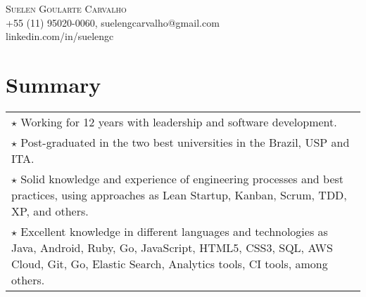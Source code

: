 \documentclass[a4paper, oneside, final]{scrartcl}
\newcommand{\vspc}{\vspace{0.15cm}} %
\begin{document}
\begin{center}

\textsc{\Huge{Suelen Goularte Carvalho}} \vspc\\
{\small +55 (11) 95020-0060, suelengcarvalho@gmail.com} \vspc\\
{\small linkedin.com/in/suelengc}






\section{Summary}
\begin{tabularx}{1\linewidth}{X}

$\star$ Working for 12 years with leadership and software development. \vspc \\

$\star$ Post-graduated in the two best universities in the Brazil, USP and ITA. \vspc \\

$\star$ Solid knowledge and experience of engineering processes and best practices, using approaches as Lean Startup, Kanban, Scrum, TDD, XP, and others. \vspc \\

$\star$ Excellent knowledge in different languages and technologies as Java, Android, Ruby, Go, JavaScript, HTML5, CSS3, SQL, AWS Cloud, Git, Go, Elastic Search, Analytics tools, CI tools, among others. \vspc \\


\end{tabularx}
\end{center}
\end{document}
